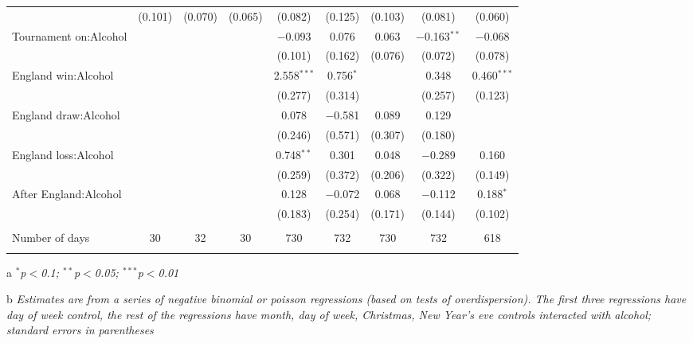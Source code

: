\documentclass[12pt, letterpaper]{article}
\begin{document}
{\begin{table}
{\begin{threeparttable}
\begin{tabular}{@{\extracolsep{5pt}}lcccccccc}
  & (0.101) & (0.070) & (0.065) & (0.082) & (0.125) & (0.103) & (0.081) & (0.060) \\ 
  Tournament on:Alcohol &  &  &  & $-$0.093 & 0.076 & 0.063 & $-$0.163$^{**}$ & $-$0.068 \\ 
  &  &  &  & (0.101) & (0.162) & (0.076) & (0.072) & (0.078) \\ 
  England win:Alcohol &  &  &  & 2.558$^{***}$ & 0.756$^{*}$ &  & 0.348 & 0.460$^{***}$ \\ 
  &  &  &  & (0.277) & (0.314) &  & (0.257) & (0.123) \\ 
  England draw:Alcohol &  &  &  & 0.078 & $-$0.581 & 0.089 & 0.129 &  \\ 
  &  &  &  & (0.246) & (0.571) & (0.307) & (0.180) &  \\ 
  England loss:Alcohol &  &  &  & 0.748$^{**}$ & 0.301 & 0.048 & $-$0.289 & 0.160 \\ 
  &  &  &  & (0.259) & (0.372) & (0.206) & (0.322) & (0.149) \\ 
  After England:Alcohol &  &  &  & 0.128 & $-$0.072 & 0.068 & $-$0.112 & 0.188$^{*}$ \\ 
  &  &  &  & (0.183) & (0.254) & (0.171) & (0.144) & (0.102) \\ 
 \hline \\[-1.8ex] 
Number of days & 30 & 32 & 30 & 730 & 732 & 730 & 732 & 618 \\ 
\hline 
\hline \\[-1.8ex] 
\end{tabular} 
\begin{tablenotes}
      \item[a] \textit{$^{*}$p$<$0.1; $^{**}$p$<$0.05; $^{***}$p$<$0.01}
      \item[b] \textit{Estimates are from a series of negative binomial  or poisson regressions (based on tests of overdispersion). The first three regressions have day of week control, the rest of the regressions have month, day of week, Christmas, New Year's eve controls interacted with alcohol; standard errors in parentheses}
    \end{tablenotes}
\end{threeparttable} }
\end{table}

}
\end{document}

